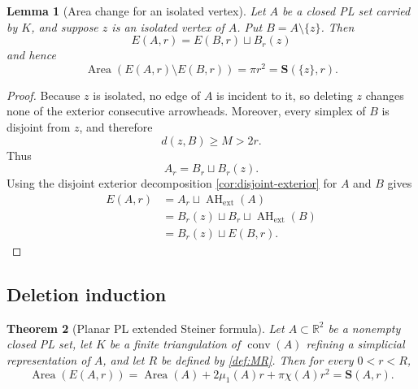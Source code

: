 \documentclass[11pt]{article}
\newtheorem{theorem}{Theorem}[section]
\newtheorem{lemma}[theorem]{Lemma}
\newcommand{\R}{\mathbb R}
\newcommand{\Area}{\operatorname{Area}}
\newcommand{\AHext}{\operatorname{AH}_{\mathrm{ext}}}
\newcommand{\Steiner}{\mathbf S}
\DeclareMathOperator{\conv}{conv}
\numberwithin{equation}{section}
\begin{document}
\begin{lemma}[Area change for an isolated vertex]\label{lem:vertex-deletion}
Let $A$ be a closed PL set carried by $K$, and suppose $z$ is an isolated vertex of $A$. Put $B=A\setminus\{z\}$. Then
\[
\boxed{
E(A,r)=E(B,r)\sqcup B_r(z)
}
\]
and hence
\[
\Area(E(A,r)\setminus E(B,r))=\pi r^2=\Steiner(\{z\},r).
\]
\end{lemma}

\begin{proof}
Because $z$ is isolated, no edge of $A$ is incident to it, so deleting $z$ changes none of the exterior consecutive arrowheads. Moreover, every simplex of $B$ is disjoint from $z$, and therefore
\[
d(z,B)\ge M>2r.
\]
Thus
\[
A_r=B_r\sqcup B_r(z).
\]
Using the disjoint exterior decomposition \cref{cor:disjoint-exterior} for $A$ and $B$ gives
\[
\begin{aligned}
E(A,r)
&=A_r\sqcup\AHext(A)\\
&=B_r(z)\sqcup B_r\sqcup\AHext(B)\\
&=B_r(z)\sqcup E(B,r).
\end{aligned}
\]
\end{proof}

\subsection{Deletion induction}

\begin{theorem}[Planar PL extended Steiner formula]\label{thm:main}
Let $A\subset\R^2$ be a nonempty closed PL set, let $K$ be a finite triangulation of $\conv(A)$ refining a simplicial representation of $A$, and let $R$ be defined by \cref{def:MR}. Then for every $0<r<R$,
\[
\boxed{
\Area(E(A,r))
=
\Area(A)+2\mu_1(A)r+\pi\chi(A)r^2
=
\Steiner(A,r).
}
\]
\end{theorem}
\end{document}
